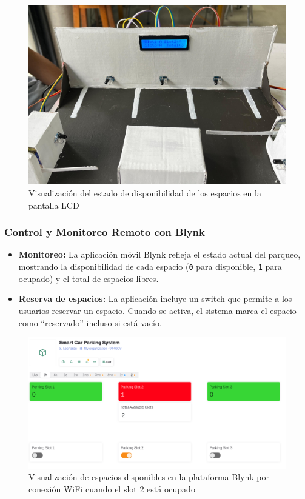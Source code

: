 \documentclass[12pt,a4paper]{article}
\begin{document}
\begin{figure}[H]
    \centering
    \includegraphics[width=0.8\linewidth]{Imagenes/lcd.jpeg}
    \caption{Visualización del estado de disponibilidad de los espacios en la pantalla LCD}
    \label{fig:101}
\end{figure}

\subsubsection{Control y Monitoreo Remoto con Blynk}
\begin{itemize}
    \item \textbf{Monitoreo:}  
    La aplicación móvil Blynk refleja el estado actual del parqueo, mostrando la disponibilidad de cada espacio (\texttt{0} para disponible, \texttt{1} para ocupado) y el total de espacios libres.

    \item \textbf{Reserva de espacios:}  
    La aplicación incluye un switch que permite a los usuarios reservar un espacio. Cuando se activa, el sistema marca el espacio como ``reservado'' incluso si está vacío.
\end{itemize}

\begin{figure}[H]
    \centering
    \includegraphics[width=1\linewidth]{Imagenes/blynk.png}
    \caption{Visualización de espacios disponibles en la plataforma Blynk por conexión WiFi cuando el slot 2 está ocupado}
    \label{fig:103}
\end{figure}
\end{document}
